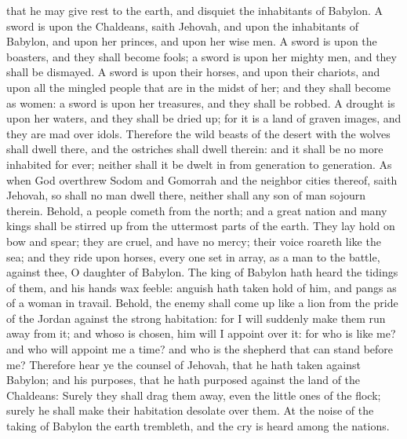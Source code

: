 that he may give rest to the earth, and disquiet the inhabitants of Babylon. A sword is upon the Chaldeans, saith Jehovah, and upon the inhabitants of Babylon, and upon her princes, and upon her wise men. A sword is upon the boasters, and they shall become fools; a sword is upon her mighty men, and they shall be dismayed. A sword is upon their horses, and upon their chariots, and upon all the mingled people that are in the midst of her; and they shall become as women: a sword is upon her treasures, and they shall be robbed. A drought is upon her waters, and they shall be dried up; for it is a land of graven images, and they are mad over idols. Therefore the wild beasts of the desert with the wolves shall dwell there, and the ostriches shall dwell therein: and it shall be no more inhabited for ever; neither shall it be dwelt in from generation to generation. As when God overthrew Sodom and Gomorrah and the neighbor cities thereof, saith Jehovah, so shall no man dwell there, neither shall any son of man sojourn therein.  Behold, a people cometh from the north; and a great nation and many kings shall be stirred up from the uttermost parts of the earth. They lay hold on bow and spear; they are cruel, and have no mercy; their voice roareth like the sea; and they ride upon horses, every one set in array, as a man to the battle, against thee, O daughter of Babylon. The king of Babylon hath heard the tidings of them, and his hands wax feeble: anguish hath taken hold of him, and pangs as of a woman in travail. Behold, the enemy shall come up like a lion from the pride of the Jordan against the strong habitation: for I will suddenly make them run away from it; and whoso is chosen, him will I appoint over it: for who is like me? and who will appoint me a time? and who is the shepherd that can stand before me? Therefore hear ye the counsel of Jehovah, that he hath taken against Babylon; and his purposes, that he hath purposed against the land of the Chaldeans: Surely they shall drag them away, even the little ones of the flock; surely he shall make their habitation desolate over them. At the noise of the taking of Babylon the earth trembleth, and the cry is heard among the nations. 

